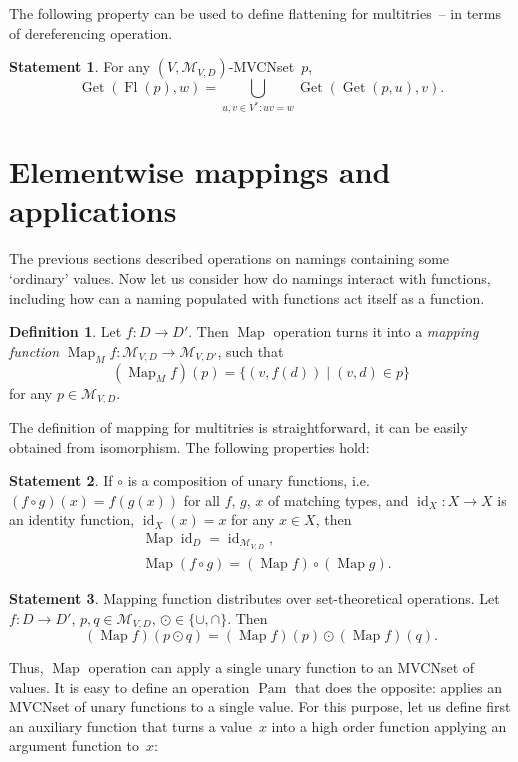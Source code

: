 \documentclass{article}
\theoremstyle{definition}
\newtheorem{Df}{Definition}
\newtheorem{St}{Statement}
\newcommand{\setcharmvcn}{M}
\newcommand{\setsymbol}[3]{\mathcal{#1}_{#2,#3}}
\newcommand{\setmvcn}[2]{\setsymbol{\setcharmvcn}{#1}{#2}}
\newcommand{\flatten}{\operatorname{Fl}}
\newcommand{\deref}{\operatorname{Get}}
\newcommand{\fmap}{\operatorname{Map}}
\newcommand{\fpam}{\operatorname{Pam}}
\newcommand{\id}{\operatorname{id}}
\begin{document}
The following property can be used to define flattening for multitries~--
in terms of dereferencing operation.
\begin{St}\label{st:deref-flatten}
For any $(V,\setmvcn{V}{D})$-MVCNset~$p$,
\[
  \deref(\flatten(p), w) =
      \bigcup_{u,v\in V^\ast: uv = w}
        \deref(\deref(p, u), v) .
\]
\end{St}



\section{Elementwise mappings and applications}

The previous sections described operations on namings containing some
`ordinary' values. Now let us consider how do namings interact with
functions, including how can a naming populated with functions act itself
as a function.

\begin{Df}\label{df:mvcn-map}
Let $f : D \to D'$. Then $\fmap$ operation turns it into a \emph{mapping
function} $\fmap_{\setcharmvcn} f : \setmvcn{V}{D} \to \setmvcn{V}{D'}$, such
that
\[
  (\fmap_{\setcharmvcn} f)(p) = \{ (v, f(d)) \mid (v, d) \in p \}
\]
for any $p \in \setmvcn{V}{D}$.
\end{Df}

The definition of mapping for multitries is straightforward, it can be easily
obtained from isomorphism. The following properties hold:

\begin{St}\label{st:map-properties}
If $\circ$ is a composition of unary functions, i.e. $(f\circ g)(x) = f(g(x))$ for
all $f$, $g$, $x$ of matching types, and $\id_X : X \to X$ is an identity function,
$\id_X(x) = x$ for any $x\in X$, then
\begin{eqnarray*}
  & \fmap \id_D = \id_{\setmvcn{V}{D}} , \\
  & \fmap (f \circ g) = (\fmap f) \circ (\fmap g) .
\end{eqnarray*}
\end{St}

\begin{St}\label{st:map-distributivity}
Mapping function distributes over set-theoretical operations.
Let $f: D \to D'$, $p, q \in \setmvcn{V}{D}$, $\odot \in \{\cup, \cap \}$. Then
\[
  (\fmap f) (p \odot q) = (\fmap f)(p) \odot (\fmap f)(q) .
\]
\end{St}

Thus, $\fmap$ operation can apply a single unary function to an MVCNset of
values. It is easy to define an operation $\fpam$ that does the opposite:
applies an MVCNset of unary functions to a single value. For this purpose,
let us define first an auxiliary function that turns a value~$x$ into a
high order function applying an argument function to~$x$:
\end{document}
